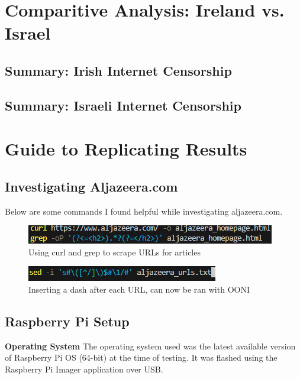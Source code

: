 \section{Comparitive Analysis: Ireland vs. Israel}
\subsection{Summary: Irish Internet Censorship}
\subsection{Summary: Israeli Internet Censorship}
\subsection{}

\section{Guide to Replicating Results}

\subsection{Investigating Aljazeera.com}
Below are some commands I found helpful while investigating aljazeera.com.

\begin{figure} [H]
    \centering
    \includegraphics[width=1\linewidth]{AljazeeraURLs1.png}
    \caption{Using curl and grep to scrape URLs for articles}
    \label{fig:enter-label}
\end{figure}

\begin{figure} [H]
    \centering
\includegraphics[width=1\linewidth]{AljazeeraComs2.png}
    \caption{Inserting a dash after each URL, can now be ran with OONI}
    \label{fig:enter-label}
\end{figure}


\subsection{Raspberry Pi Setup}
\textbf{Operating System}
The operating system used was the latest available version of Raspberry Pi OS (64-bit) at the time of testing. It was flashed using the Raspberry Pi Imager application over USB. 

